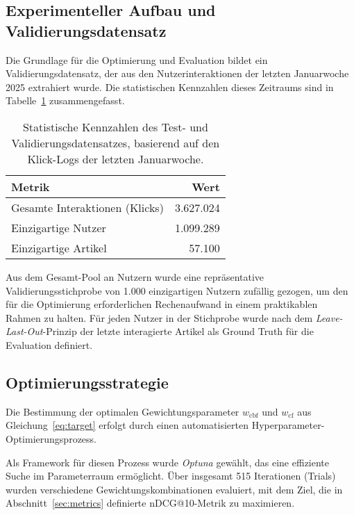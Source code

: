 \subsection{Experimenteller Aufbau und Validierungsdatensatz}
Die Grundlage für die Optimierung und Evaluation bildet ein Validierungsdatensatz, der aus den 
Nutzerinteraktionen der letzten Januarwoche 2025 extrahiert wurde. Die statistischen Kennzahlen 
dieses Zeitraums sind in Tabelle~\ref{tab:statistiken_test} zusammengefasst.

\begin{table}[H]
    \centering
    \caption{Statistische Kennzahlen des Test- und Validierungsdatensatzes, basierend auf den Klick-Logs der letzten Januarwoche.}
    \label{tab:statistiken_test}
    \begin{tabular}{lr}
        \toprule
        \textbf{Metrik} & \textbf{Wert} \\
        \midrule
        Gesamte Interaktionen (Klicks) & 3.627.024 \\
        Einzigartige Nutzer & 1.099.289 \\
        Einzigartige Artikel & 57.100 \\
        \bottomrule
    \end{tabular}
\end{table}

Aus dem Gesamt-Pool an Nutzern wurde eine repräsentative Validierungsstichprobe von 1.000 
einzigartigen Nutzern zufällig gezogen, um den für die Optimierung erforderlichen Rechenaufwand in einem praktikablen 
Rahmen zu halten. Für jeden Nutzer in der Stichprobe wurde nach dem \textit{Leave-Last-Out}-Prinzip 
der letzte interagierte Artikel als Ground Truth für die Evaluation definiert.

\subsection{Optimierungsstrategie}
\label{sec:opt_strat}
Die Bestimmung der optimalen Gewichtungsparameter $w_\mathrm{cbf}$ und $w_\mathrm{cf}$ aus 
Gleichung~\ref{eq:target} erfolgt durch einen automatisierten Hyperparameter-Optimierungsprozess.

Als Framework für diesen Prozess wurde \textit{Optuna} gewählt, das eine effiziente Suche im 
Parameterraum ermöglicht. Über insgesamt 515 Iterationen (Trials) wurden verschiedene 
Gewichtungskombinationen evaluiert, mit dem Ziel, die in Abschnitt~\ref{sec:metrics} definierte 
nDCG@10-Metrik zu maximieren.

